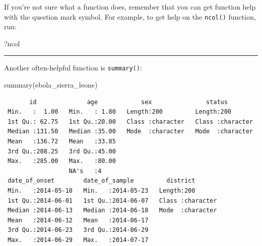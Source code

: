 \documentclass[
  letterpaper,
  DIV=11,
  numbers=noendperiod]{scrreprt}
\newenvironment{Shaded}{\begin{snugshade}}{\end{snugshade}}
\newcommand{\FunctionTok}[1]{\textcolor[rgb]{0.28,0.35,0.67}{#1}}
\newcommand{\NormalTok}[1]{\textcolor[rgb]{0.00,0.23,0.31}{#1}}
\begin{document}
\begin{tcolorbox}[enhanced jigsaw, colframe=quarto-callout-note-color-frame, rightrule=.15mm, opacityback=0, breakable, coltitle=black, colbacktitle=quarto-callout-note-color!10!white, bottomrule=.15mm, leftrule=.75mm, toprule=.15mm, arc=.35mm, bottomtitle=1mm, colback=white, left=2mm, opacitybacktitle=0.6, titlerule=0mm, title=\textcolor{quarto-callout-note-color}{\faInfo}\hspace{0.5em}{Reminder}, toptitle=1mm]

If you're not sure what a function does, remember that you can get
function help with the question mark symbol. For example, to get help on
the \texttt{ncol()} function, run:

\begin{Shaded}
\begin{Highlighting}[]
\NormalTok{?ncol}
\end{Highlighting}
\end{Shaded}

\end{tcolorbox}

\begin{center}\rule{0.5\linewidth}{0.5pt}\end{center}

Another often-helpful function is \texttt{summary()}:

\begin{Shaded}
\begin{Highlighting}[]
\FunctionTok{summary}\NormalTok{(ebola\_sierra\_leone)}
\end{Highlighting}
\end{Shaded}

\begin{verbatim}
       id              age            sex               status         
 Min.   :  1.00   Min.   : 1.80   Length:200         Length:200        
 1st Qu.: 62.75   1st Qu.:20.00   Class :character   Class :character  
 Median :131.50   Median :35.00   Mode  :character   Mode  :character  
 Mean   :136.72   Mean   :33.85                                        
 3rd Qu.:208.25   3rd Qu.:45.00                                        
 Max.   :285.00   Max.   :80.00                                        
                  NA's   :4                                            
 date_of_onset        date_of_sample         district        
 Min.   :2014-05-18   Min.   :2014-05-23   Length:200        
 1st Qu.:2014-06-01   1st Qu.:2014-06-07   Class :character  
 Median :2014-06-13   Median :2014-06-18   Mode  :character  
 Mean   :2014-06-12   Mean   :2014-06-17                     
 3rd Qu.:2014-06-23   3rd Qu.:2014-06-29                     
 Max.   :2014-06-29   Max.   :2014-07-17                     
                                                             
\end{verbatim}
\end{document}
